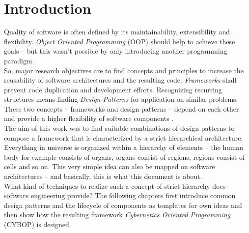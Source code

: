 \section{Introduction}
Quality of software is often defined by its maintainability,
extensibility and flexibility. \emph{Object Oriented Programming} (OOP)
should help to achieve these goals -- but this wasn't possible by only
introducing another programming paradigm.\\
So, major research objectives are to find concepts and principles
to increase the reusability of software architectures and the
resulting code. \emph{Frameworks} shall prevent code duplication and
development efforts. Recognizing recurring structures means finding
\emph{Design Patterns} for application on similar problems. These two
concepts -- frameworks and design patterns -- depend on each other
and provide a higher flexibility of software components \cite{ch:pree}.\\
The aim of this work was to find suitable combinations of design
patterns to compose a framework that is characterized by a strict
hierarchical architecture. Everything in universe is organized
within a hierarchy of elements -- the human body for example
consists of organs, organs consist of regions, regions consist of
cells and so on. This very simple idea can also be mapped on
software architectures -- and basically, this is what this document
is about.\\
What kind of techniques to realize such a concept of strict
hierarchy does software engineering provide? The following
chapters first introduce common design patterns and the lifecycle
of components as templates for own ideas and then show how the
resulting framework \emph{Cybernetics Oriented Programming}
(CYBOP) \cite{cybop} is designed.
